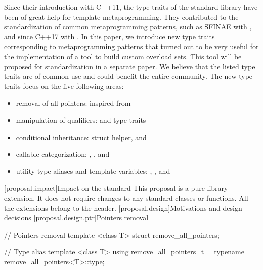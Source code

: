 \documentclass[ebook,10pt,oneside,openany,final]{memoir}
\begin{document}
Since their introduction with C++11, the type traits of the standard library have been of great help for template metaprogramming. They contributed to the standardization of common metaprogramming patterns, such as SFINAE with , and since C++17 with . In this paper, we introduce new type traits corresponding to metaprogramming patterns that turned out to be very useful for the implementation of a tool to build custom overload sets. This tool will be proposed for standardization in a separate paper. We believe that the listed type traits are of common use and could benefit the entire community. The new type traits focus on the five following areas:
\begin{itemize}
\item removal of all pointers:  inspired from 
\item manipulation of qualifiers:  and  type traits
\item conditional inheritance:  struct helper,  and 
\item callable categorization: , ,  and 
\item utility type aliases and template variables: , ,  and 
\end{itemize}
[proposal.impact]{Impact on the standard}
This proposal is a pure library extension. It does not require changes to any standard classes or functions. All the extensions belong to the  header.
[proposal.design]{Motivations and design decisions}
[proposal.design.ptr]{Pointers removal}

\begin{codeblock}
// Pointers removal
template <class T> struct remove_all_pointers;

// Type alias
template <class T> using remove_all_pointers_t = typename remove_all_pointers<T>::type;
\end{codeblock}
\end{document}
